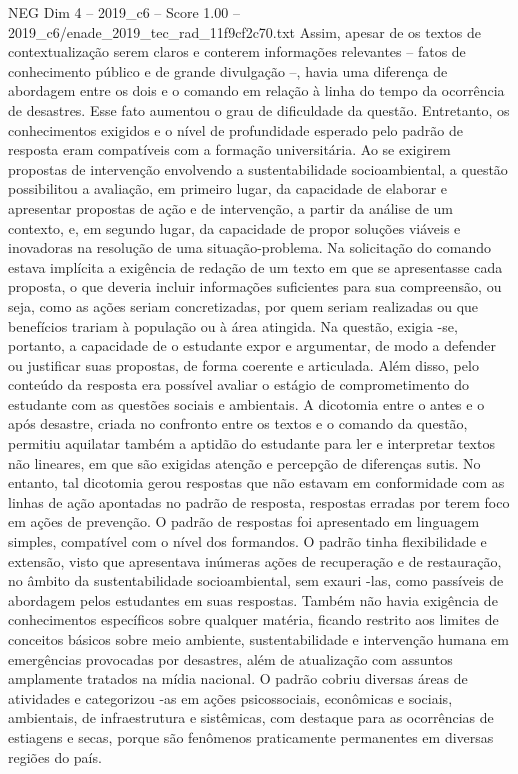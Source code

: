 \begin{textsample}{NEG Dim 4 – 2019\_c6 – Score 1.00 – 2019\_c6/enade\_2019\_tec\_rad\_11f9cf2c70.txt}
Assim, apesar de os textos de contextualização serem claros e conterem informações relevantes – fatos de conhecimento público e de grande divulgação –, havia uma diferença de abordagem entre os dois e o comando em relação à linha do tempo da ocorrência de desastres.
Esse fato aumentou o grau de dificuldade da questão.
Entretanto, os conhecimentos exigidos e o nível de profundidade esperado pelo padrão de resposta eram compatíveis com a formação universitária.
Ao se exigirem propostas de intervenção envolvendo a sustentabilidade socioambiental, a questão possibilitou a avaliação, em primeiro lugar, da capacidade de elaborar e apresentar propostas de ação e de intervenção, a partir da análise de um contexto, e, em segundo lugar, da capacidade de propor soluções viáveis e inovadoras na resolução de uma situação-problema.
Na solicitação do comando estava implícita a exigência de redação de um texto em que se apresentasse cada proposta, o que deveria incluir informações suficientes para sua compreensão, ou seja, como as ações seriam concretizadas, por quem seriam realizadas ou que benefícios trariam à população ou à área atingida.
Na questão, exigia -se, portanto, a capacidade de o estudante expor e argumentar, de modo a defender ou justificar suas propostas, de forma coerente e articulada.
Além disso, pelo conteúdo da resposta era possível avaliar o estágio de comprometimento do estudante com as questões sociais e ambientais.
A dicotomia entre o antes e o após desastre, criada no confronto entre os textos e o comando da questão, permitiu aquilatar também a aptidão do estudante para ler e interpretar textos não lineares, em que são exigidas atenção e percepção de diferenças sutis.
No entanto, tal dicotomia gerou respostas que não estavam em conformidade com as linhas de ação apontadas no padrão de resposta, respostas erradas por terem foco em ações de prevenção.
O padrão de respostas foi apresentado em linguagem simples, compatível com o nível dos formandos.
O padrão tinha flexibilidade e extensão, visto que apresentava inúmeras ações de recuperação e de restauração, no âmbito da sustentabilidade socioambiental, sem exauri -las, como passíveis de abordagem pelos estudantes em suas respostas.
Também não havia exigência de conhecimentos específicos sobre qualquer matéria, ficando restrito aos limites de conceitos básicos sobre meio ambiente, sustentabilidade e intervenção humana em emergências provocadas por desastres, além de atualização com assuntos amplamente tratados na mídia nacional.
O padrão cobriu diversas áreas de atividades e categorizou -as em ações psicossociais, econômicas e sociais, ambientais, de infraestrutura e sistêmicas, com destaque para as ocorrências de estiagens e secas, porque são fenômenos praticamente permanentes em diversas regiões do país.

\end{textsample}
